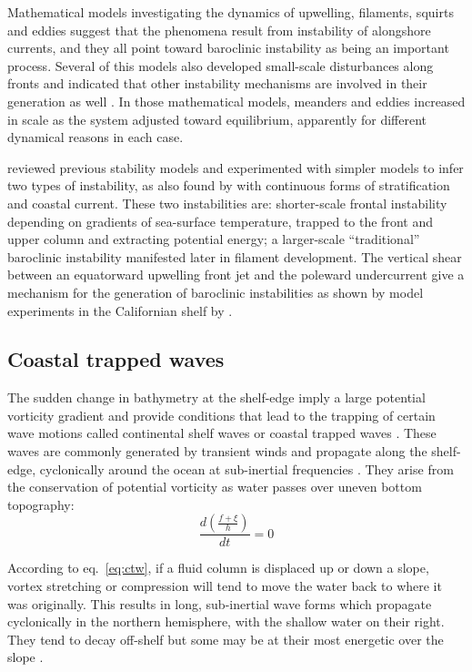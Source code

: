 Mathematical models investigating the dynamics of upwelling,
filaments, squirts and eddies suggest that the phenomena result
from instability of alongshore currents, and they all point toward
baroclinic instability as being an important process. Several of
this models also developed small-scale disturbances along fronts
and indicated that other instability mechanisms are involved in
their generation as well \citep{McCreary91}. In those mathematical
models, meanders and eddies increased in scale as the system
adjusted toward equilibrium, apparently for different dynamical
reasons in each case.

\citet{McCreary91} reviewed previous stability models and
experimented with simpler models to infer two types of
instability, as also found by \citet{Barth94} with continuous
forms of stratification and coastal current. These two
instabilities are: shorter-scale frontal instability depending on
gradients of sea-surface temperature, trapped to the front and
upper column and extracting potential energy; a larger-scale
``traditional'' baroclinic instability manifested later in
filament development. The vertical shear between an equatorward
upwelling front jet and the poleward undercurrent give a mechanism
for the generation of baroclinic instabilities as shown by model
experiments in the Californian shelf by \citet{Batteen89}.

\subsection{Coastal trapped waves}
The sudden change in bathymetry at the shelf-edge imply a large
potential vorticity gradient and provide conditions that lead to
the trapping of certain wave motions called continental shelf
waves or coastal trapped waves \citep{Huthnance81}. These waves
are commonly generated by transient winds \citep{Adams69} and
propagate along the shelf-edge, cyclonically around the ocean at
sub-inertial frequencies \citep{Huthnance86}. They arise from the
conservation of potential vorticity as water passes over uneven
bottom topography:
\begin{equation}\label{eq:ctw}
  \frac{d(\frac{f+\xi}{h})}{dt}=0
\end{equation}

According to eq.~\ref{eq:ctw}, if a fluid column is displaced up
or down a slope, vortex stretching or compression will tend to
move the water back to where it was originally. This results in
long, sub-inertial wave forms which propagate cyclonically in the
northern hemisphere, with the shallow water on their right. They
tend to decay off-shelf but some may be at their most energetic
over the slope \citep{Huthnance95}.

